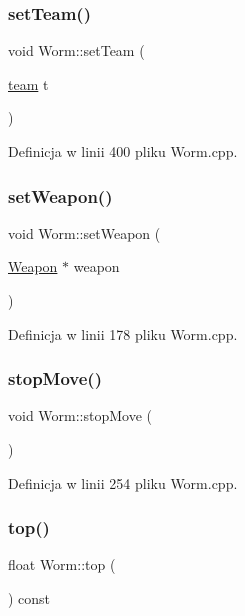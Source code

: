 \subsubsection{\texorpdfstring{set\+Team()}{setTeam()}}
{\footnotesize\ttfamily void Worm\+::set\+Team (\begin{DoxyParamCaption}\item[{\mbox{\hyperlink{_worm_8h_ae79581ee1998185d7cb41ab84352b97e}{team}}}]{t }\end{DoxyParamCaption})}



Definicja w linii 400 pliku Worm.\+cpp.

\mbox{\label{class_worm_a9f2a337a176e5186c7227880337c98c3}} 
\subsubsection{\texorpdfstring{set\+Weapon()}{setWeapon()}}
{\footnotesize\ttfamily void Worm\+::set\+Weapon (\begin{DoxyParamCaption}\item[{\mbox{\hyperlink{class_weapon}{Weapon}} $\ast$}]{weapon }\end{DoxyParamCaption})}



Definicja w linii 178 pliku Worm.\+cpp.

\mbox{\label{class_worm_a1cdb0c544127417ba4b95fd8e5d3f9fc}} 
\subsubsection{\texorpdfstring{stop\+Move()}{stopMove()}}
{\footnotesize\ttfamily void Worm\+::stop\+Move (\begin{DoxyParamCaption}{ }\end{DoxyParamCaption})}



Definicja w linii 254 pliku Worm.\+cpp.

\mbox{\label{class_worm_a3d65c40350e8e0317bd594a3cb7c8bba}} 
\subsubsection{\texorpdfstring{top()}{top()}}
{\footnotesize\ttfamily float Worm\+::top (\begin{DoxyParamCaption}{ }\end{DoxyParamCaption}) const}



